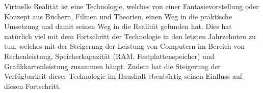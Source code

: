 
Virtuelle Realität ist eine Technologie, welches von einer Fantasievorstellung oder Konzept aus Büchern, Filmen und Theorien, einen Weg in
die praktische Umsetzung und damit seinen Weg in die Realität gefunden hat. Dies hat natürlich viel mit dem Fortschritt der Technologie in
den letzten Jahrzehnten zu tun, welches mit der Steigerung der Leistung von Computern im Bereich von Rechenleistung, Speicherkapazität (RAM,
Festplattenspeicher) und Grafikkartenleistung zusammen hängt. Zudem hat die Steigerung der Verfügbarkeit dieser Technologie im Haushalt
ebenbürtig seinen Einfluss auf diesen Fortschritt.

